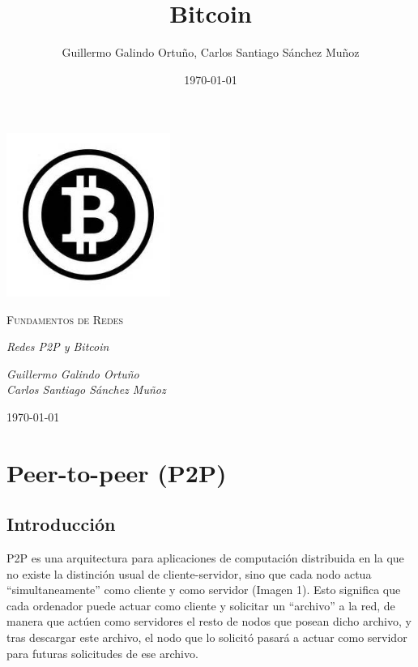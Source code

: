 \documentclass[11pt,a4paper]{article}
\title{Bitcoin}
\author{Guillermo Galindo Ortuño, Carlos Santiago Sánchez Muñoz}
\date{\today}
\begin{document}
\begin{titlepage}
  \centering
  
  \vspace{10cm}
  \includegraphics[width=0.4\textwidth]{bitcoinlogo2.jpeg}\par\vspace{1cm}
  {\scshape\large Fundamentos de Redes \par} \vspace{1cm}
  \vspace{0.4cm}
  {\large\itshape Redes P2P y Bitcoin\\}
  \vspace{0.6cm}
  {\large\itshape  Guillermo Galindo Ortuño\\Carlos Santiago Sánchez Muñoz \par} \vspace{1.00cm}

  \vfill
  {\large \today\par}

\end{titlepage}
\tableofcontents
\newpage

\section{Peer-to-peer (P2P)}
\subsection{Introducción}
P2P es una arquitectura para aplicaciones de computación distribuida en la que no existe la distinción usual de cliente-servidor, sino que cada nodo actua ``simultaneamente'' como cliente y como servidor (Imagen 1). Esto significa que cada ordenador puede actuar como cliente y solicitar un ``archivo'' a la red, de manera que actúen como servidores el resto de nodos que posean dicho archivo, y tras descargar este archivo, el nodo que lo solicitó pasará a actuar como servidor para futuras solicitudes de ese archivo.\\
\end{document}
